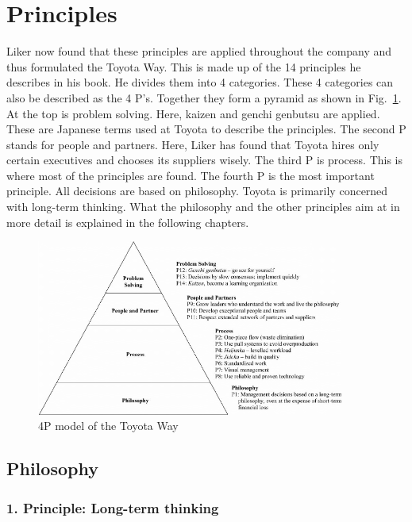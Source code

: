 \documentclass[a4paper,11pt]{article}
\begin{document}
\clearpage

\section{Principles}

Liker now found that these principles are applied throughout the company and
thus formulated the Toyota Way. This is made up of the 14 principles he
describes in his book. He divides them into 4 categories. These 4 categories
can also be described as the 4 P's. Together they form a pyramid as shown in
Fig.~\ref{4P}. At the top is problem solving. Here, kaizen and genchi genbutsu
are applied. These are Japanese terms used at Toyota to describe the
principles. The second P stands for people and partners. Here, Liker has found
that Toyota hires only certain executives and chooses its suppliers
wisely. The third P is process. This is where most of the principles are
found. The fourth P is the most important principle. All decisions are based
on philosophy. Toyota is primarily concerned with long-term thinking. What the
philosophy and the other principles aim at in more detail is explained in the
following chapters.

\begin{figure}[h] 
  \centering
     \includegraphics[width=0.9\textwidth]{4P.png}
  \caption{4P model of the Toyota Way \cite{Abbildung-2}}
  \label{4P}
\end{figure}

\subsection{Philosophy}

\subsubsection*{1. Principle: Long-term thinking}
\end{document}
